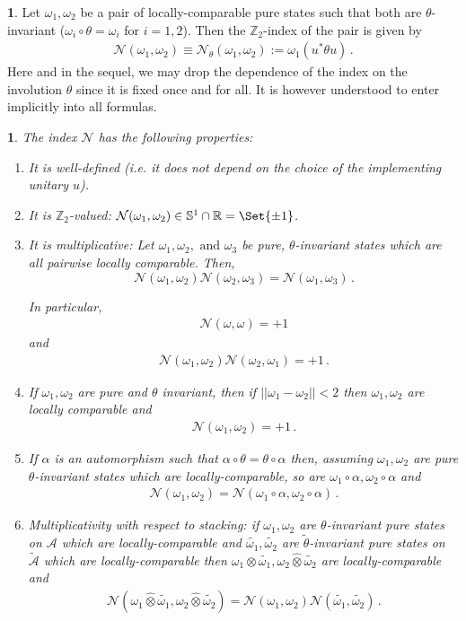 \documentclass[a4paper,10pt]{article}
\numberwithin{equation}{section}
\theoremstyle{plain}
\newtheorem{thm}{\protect\theoremname}[section]
\theoremstyle{plain}
\theoremstyle{plain}
\theoremstyle{plain}
\theoremstyle{plain}
\theoremstyle{remark}
\theoremstyle{definition}
\newtheorem{defn}[defn]{\protect\definitionname}
\providecommand{\definitionname}{Definition}
\providecommand{\theoremname}{Theorem}
\newcommand{\ZZ}{\mathbb{Z}}
\newcommand{\RR}{\mathbb{R}}
\newcommand{\calA}{\mathcal{A}}
\newcommand{\calN}{\mathcal{N}}
\newcommand{\JS}[1]{\textcolor{orange}{Jacob: [#1]}}
\newcommand{\eq}[1]{\begin{align*}#1\end{align*}}
\newcommand{\eql}[1]{\begin{align}#1\end{align}}
\begin{document}
\begin{defn} Let $\omega_1,\omega_2$ be a pair of locally-comparable pure states such that both are $\theta$-invariant ($\omega_i\circ\theta=\omega_i$ for $i=1,2$). Then the $\ZZ_2$-index of the pair is given by
\eql{
    \calN(\omega_1,\omega_2)\equiv \calN_\theta(\omega_1,\omega_2)  := \omega_1(u^\ast\theta u) \,.
}    Here and in the sequel, we may drop the dependence of the index on the involution $\theta$ since it is fixed once and for all. It is however understood to enter implicitly into all formulas.
\end{defn}
\begin{thm}\label{thm:main theorem for properties of the Z2 index of a pair} The index $\calN$ has the following properties:
\begin{enumerate}
    \item It is well-defined (i.e. it does not depend on the choice of the implementing unitary $u$).
    \item It is $\ZZ_2$-valued: $\calN(\omega_1,\omega_2) \in \mathbb{S}^1\cap\RR=\Set{\pm 1}$.
    \item It is multiplicative: Let $\omega_1, \omega_2, \text{ and }\omega_3$ be pure, $\theta$-invariant states which are all pairwise locally comparable. Then, 
    \[\calN(\omega_1, \omega_2)\calN(\omega_2, \omega_3) = \calN(\omega_1, \omega_3)\,.\]

    In particular, \eql{\calN(\omega,\omega)=+1} and \eql{\calN(\omega_1,\omega_2)\calN(\omega_2,\omega_1)=+1\,.}
    \item If $\omega_1,\omega_2$ are pure and $\theta$ invariant, then if $||\omega_1 - \omega_2||<2 $ then $\omega_1,\omega_2$ are locally comparable and \eql{\calN(\omega_1, \omega_2) = +1\,.}
    \item 
    If $\alpha$ is an automorphism such that $\alpha \circ \theta = \theta \circ \alpha$ then, assuming $\omega_1,\omega_2$ are pure $\theta$-invariant states which are locally-comparable, so are $\omega_1\circ\alpha,\omega_2\circ\alpha$ and \eql{\calN(\omega_1, \omega_2 ) = \calN(\omega_1 \circ \alpha, \omega_2 \circ \alpha)\,.}
    \item Multiplicativity with respect to stacking: if $\omega_1,\omega_2$ are $\theta$-invariant pure states on $\calA$ which are locally-comparable and $\widetilde{\omega_1},\widetilde{\omega_2}$ are $\widetilde{\theta}$-invariant pure states on $\widetilde{\calA}$ which are locally-comparable then $\omega_1\hat{\otimes}\widetilde{\omega_1},\omega_2\hat{\otimes}\widetilde{\omega_2}$ are locally-comparable and \eq{
    \calN(\omega_1\hat{\otimes}\widetilde{\omega_1},\omega_2\hat{\otimes}\widetilde{\omega_2}) = \calN(\omega_1,\omega_2)\calN(\widetilde{\omega_1},\widetilde{\omega_2})\,.
    } 
\end{enumerate}
\end{thm}
\end{document}
